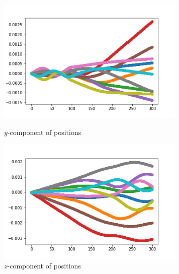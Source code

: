 \documentclass[12pt]{article}
\begin{document}
	\begin{figure}[H]
		\begin{multicols}{2}
			\includegraphics[width=\linewidth, height=6cm]{multipsy2.png} \caption{$y$-component of positions} \label{multipsy2} \par
			\includegraphics[width=\linewidth, height=6cm]{multipsz2.png} \caption{$z$-component of positions} \label{multipsz2} \par
		\end{multicols}
	\end{figure}
	
\end{document}
